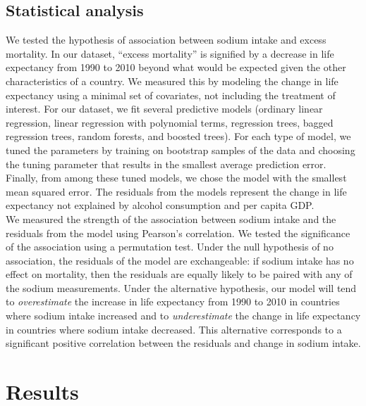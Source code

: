 \documentclass{article}
\begin{document}
\subsection{Statistical analysis}
We tested the hypothesis of association between sodium intake and excess mortality.  In our dataset, ``excess mortality'' is signified by a decrease in life expectancy from 1990 to 2010 beyond what would be expected given the other characteristics of a country.  We measured this by modeling the change in life expectancy using a minimal set of covariates, not including the treatment of interest.  For our dataset, we fit several predictive models (ordinary linear regression, linear regression with polynomial terms, regression trees, bagged regression trees, random forests, and boosted trees).  For each type of model, we tuned the parameters by training on bootstrap samples of the data and choosing the tuning parameter that results in the smallest average prediction error.  Finally, from among these tuned models, we chose the model with the smallest mean squared error.  The residuals from the models represent the change in life expectancy not explained by alcohol consumption and per capita GDP. \\

We measured the strength of the association between sodium intake and the residuals from the model using Pearson's correlation. We tested the significance of the association using a permutation test.  Under the null hypothesis of no association, the residuals of the model are exchangeable: if sodium intake has no effect on mortality, then the residuals are equally likely to be paired with any of the sodium measurements.  Under the alternative hypothesis, our model will tend to \textit{overestimate} the increase in life expectancy from 1990 to 2010 in countries where sodium intake increased and to \textit{underestimate} the change in life expectancy in countries where sodium intake decreased. This alternative corresponds to a significant positive correlation between the residuals and change in sodium intake.  


\section{Results}
\end{document}
